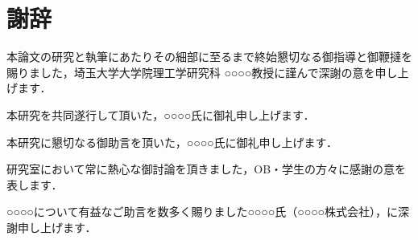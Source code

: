 ﻿%

\chapter*{謝辞}\label{chapter:謝辞}

本論文の研究と執筆にあたりその細部に至るまで終始懇切なる御指導と御鞭撻を賜りました，埼玉大学大学院理工学研究科 ○○○○教授に謹んで深謝の意を申し上げます．

本研究を共同遂行して頂いた，○○○○氏に御礼申し上げます．

本研究に懇切なる御助言を頂いた，○○○○氏に御礼申し上げます．

研究室において常に熱心な御討論を頂きました，OB・学生の方々に感謝の意を表します．

○○○○について有益なご助言を数多く賜りました○○○○氏（○○○○株式会社），に深謝申し上げます．
